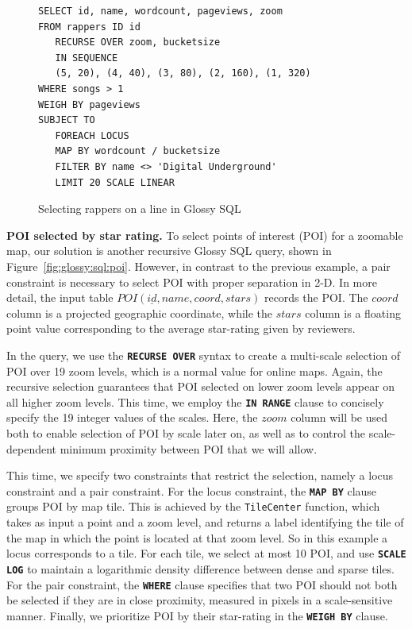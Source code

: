 \documentclass[11pt, oneside]{report}
\newcommand{\minisec}[1]{\noindent\textbf{#1.}}
\begin{document}
\begin{figure}[!t]
\begin{center}
\begin{lstlisting}
SELECT id, name, wordcount, pageviews, zoom
FROM rappers ID id
   RECURSE OVER zoom, bucketsize 
   IN SEQUENCE 
   (5, 20), (4, 40), (3, 80), (2, 160), (1, 320)
WHERE songs > 1
WEIGH BY pageviews
SUBJECT TO
   FOREACH LOCUS
   MAP BY wordcount / bucketsize
   FILTER BY name <> 'Digital Underground'
   LIMIT 20 SCALE LINEAR
\end{lstlisting}
\vspace*{-2ex}
\caption{Selecting rappers on a line in Glossy SQL}
\label{fig:glossy:sql:rappers}
\end{center}
\vspace*{-5ex}
\end{figure}

\minisec{POI selected by star rating}
To select points of interest (POI) for a zoomable map, our solution is another recursive Glossy SQL query, shown in Figure~\ref{fig:glossy:sql:poi}. However, in contrast to the previous example, a pair constraint is necessary to select POI with proper separation in 2-D. 
In more detail, the input table $POI(\underline{id}, name, coord, stars)$ records the POI. The $coord$ column is a projected geographic coordinate, while the $stars$ column is a floating point value corresponding to the average star-rating given by reviewers.

In the query, we use the \textbf{\texttt{RECURSE OVER}} syntax to create a multi-scale selection of POI over 19 zoom levels, which is a normal value for online maps. Again, the recursive selection guarantees that POI selected on lower zoom levels appear on all higher zoom levels. This time, we employ the \textbf{\texttt{IN RANGE}} clause to concisely specify the 19 integer values of the scales. Here, the $zoom$ column will be used both to enable selection of POI by scale later on, as well as to control the scale-dependent minimum proximity between POI that we will allow.

This time, we specify two constraints that restrict the selection, namely a locus constraint and a pair constraint. For the locus constraint, the \textbf{\texttt{MAP BY}} clause groups POI by map tile. This is achieved by the \texttt{TileCenter} function, which takes as input a point and a zoom level, and returns a label identifying the tile of the map in which the point is located at that zoom level. So in this example a locus corresponds to a tile. For each tile, we select at most 10 POI, and use \textbf{\texttt{SCALE LOG}} to maintain a logarithmic density difference between dense and sparse tiles. For the pair constraint, the \textbf{\texttt{WHERE}} clause specifies that two POI should not both be selected if they are in close proximity, measured in pixels in a scale-sensitive manner. Finally, we prioritize POI by their star-rating in the \textbf{\texttt{WEIGH BY}} clause. 
\end{document}
